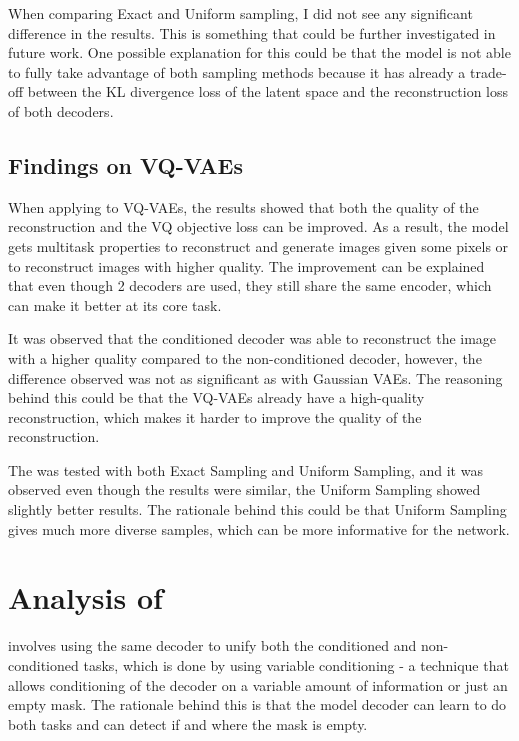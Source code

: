 When comparing Exact and Uniform sampling, I did not see any significant difference in the results. This is something that could be further investigated in future work. One possible explanation for this could be that the model is not able to fully take advantage of both sampling methods because it has already a trade-off between the KL divergence loss of the latent space and the reconstruction loss of both decoders.

\subsection{Findings on VQ-VAEs}

When applying  to VQ-VAEs, the results showed that both the quality of the reconstruction and the VQ objective loss can be improved. As a result, the model gets multitask properties to reconstruct and generate images given some pixels or to reconstruct images with higher quality. The improvement can be explained that even though 2 decoders are used, they still share the same encoder, which can make it better at its core task. 

It was observed that the conditioned decoder was able to reconstruct the image with a higher quality compared to the non-conditioned decoder, however, the difference observed was not as significant as with Gaussian VAEs. The reasoning behind this could be that the VQ-VAEs already have a high-quality reconstruction, which makes it harder to improve the quality of the reconstruction.

The  was tested with both Exact Sampling and Uniform Sampling, and it was observed even though the results were similar, the Uniform Sampling showed slightly better results. The rationale behind this could be that Uniform Sampling gives much more diverse samples, which can be more informative for the network.


\section{Analysis of }

 involves using the same decoder to unify both the conditioned and non-conditioned tasks, which is done by using variable conditioning - a technique that allows conditioning of the decoder on a variable amount of information or just an empty mask. The rationale behind this is that the model decoder can learn to do both tasks and can detect if and where the mask is empty.

